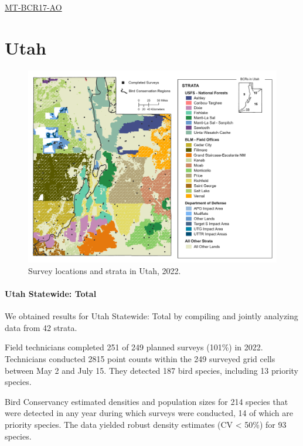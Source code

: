 \documentclass[
  letterpaper,
  DIV=11,
  numbers=noendperiod,
  oneside]{scrreprt}
\begin{document}
\href{http://www.rmbo.org/new_site/adc/QueryWindow.aspx\#N4IgzgLgTghhCuBbEAuABCAsgFQLQCEBhAJQEYB2XAQQHl0qAbBtGiACwFMo0AZGAOwAmYEAF8gA}{MT-BCR17-AO}

\hypertarget{utah}{%
\chapter{Utah}\label{utah}}

\begin{figure}

{\centering \includegraphics{./UT_Report_2022.png}

}

\caption{\label{fig-ut}Survey locations and strata in Utah, 2022.}

\end{figure}

\hypertarget{utah-statewide-total}{%
\subsubsection{Utah Statewide: Total}\label{utah-statewide-total}}

We obtained results for Utah Statewide: Total by compiling and jointly
analyzing data from 42 strata.

Field technicians completed 251 of 249 planned surveys (101\%) in 2022.
Technicians conducted 2815 point counts within the 249 surveyed grid
cells between May 2 and July 15. They detected 187 bird species,
including 13 priority species.

Bird Conservancy estimated densities and population sizes for 214
species that were detected in any year during which surveys were
conducted, 14 of which are priority species. The data yielded robust
density estimates (CV \textless{} 50\%) for 93 species.
\end{document}
